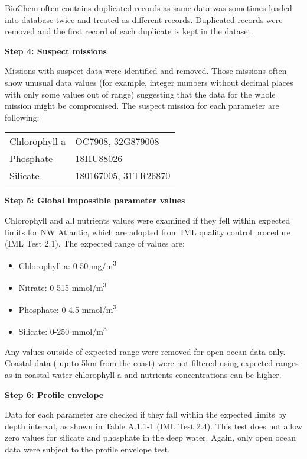 \documentclass[letterpaper,portrait,11pt]{scrartcl}
\numberwithin{equation}{section}		%
\numberwithin{figure}{section}			%
\numberwithin{table}{section}				%
\begin{document}
\begin{itemize*}
\begin{appendices}
BioChem often contains duplicated records as same data was sometimes loaded into database twice and treated as different records. Duplicated records were removed and the first record of each duplicate is kept in the dataset.

\textbf{Step 4: Suspect missions}

Missions with suspect data were identified and removed. Those missions often show unusual data values (for example, integer numbers without decimal places with only some values out of range) suggesting that the data for the whole mission might be compromised. The suspect mission for each parameter are following:

\begin{table} [h]
  \begin{tabular}{ll}
	Chlorophyll-a & OC7908, 32G879008 \\
  Phosphate & 18HU88026 \\
  Silicate & 180167005, 31TR26870 \\
  \end{tabular}
\end{table}


\textbf{Step 5: Global impossible parameter values}

Chlorophyll and all nutrients values were examined if they fell within expected limits for NW Atlantic, which are adopted from IML quality control procedure (IML Test 2.1). The expected range of values are:
\begin{itemize}
  \item Chlorophyll-a: 0-50 mg/m\textsuperscript{3}
  \item Nitrate: 0-515 mmol/m\textsuperscript{3}
  \item Phosphate: 0-4.5 mmol/m\textsuperscript{3}
  \item Silicate: 0-250 mmol/m\textsuperscript{3}
\end{itemize}

Any values outside of expected range were removed for open ocean data only. Coastal data ( up to 5km from the coast) were not filtered using expected ranges as in coastal water chlorophyll-a and nutrients concentrations can be higher. 

\textbf{Step 6: Profile envelope}

Data  for each parameter are checked if they fall within the expected limits by depth interval, as shown in Table A.1.1-1 (IML Test 2.4). This test does not allow zero values for silicate and phosphate in the deep water. Again, only open ocean data were subject to the profile envelope test.


\end{appendices}
\end{itemize*}
\end{document}
